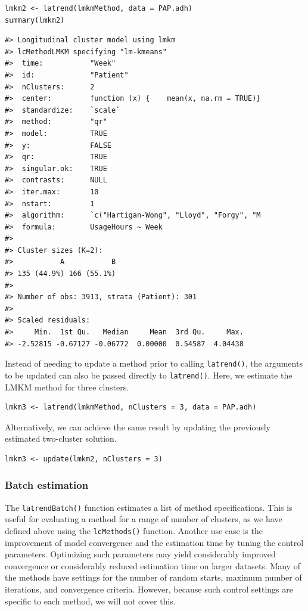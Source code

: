 \begin{verbatim}
lmkm2 <- latrend(lmkmMethod, data = PAP.adh)
summary(lmkm2)
\end{verbatim}

\begin{verbatim}
#> Longitudinal cluster model using lmkm
#> lcMethodLMKM specifying "lm-kmeans"
#>  time:           "Week"
#>  id:             "Patient"
#>  nClusters:      2
#>  center:         function (x) {    mean(x, na.rm = TRUE)}
#>  standardize:    `scale`
#>  method:         "qr"
#>  model:          TRUE
#>  y:              FALSE
#>  qr:             TRUE
#>  singular.ok:    TRUE
#>  contrasts:      NULL
#>  iter.max:       10
#>  nstart:         1
#>  algorithm:      `c("Hartigan-Wong", "Lloyd", "Forgy", "M
#>  formula:        UsageHours ~ Week
#> 
#> Cluster sizes (K=2):
#>           A           B 
#> 135 (44.9%) 166 (55.1%) 
#> 
#> Number of obs: 3913, strata (Patient): 301
#> 
#> Scaled residuals:
#>     Min.  1st Qu.   Median     Mean  3rd Qu.     Max. 
#> -2.52815 -0.67127 -0.06772  0.00000  0.54587  4.04438
\end{verbatim}

Instead of needing to update a method prior to calling \texttt{latrend()}, the arguments to be updated can also be passed directly to \texttt{latrend()}. Here, we estimate the LMKM method for three clusters.

\begin{verbatim}
lmkm3 <- latrend(lmkmMethod, nClusters = 3, data = PAP.adh)
\end{verbatim}

Alternatively, we can achieve the same result by updating the previously estimated two-cluster solution.

\begin{verbatim}
lmkm3 <- update(lmkm2, nClusters = 3)
\end{verbatim}

\subsubsection{Batch estimation}\label{batch-estimation}

The \texttt{latrendBatch()} function estimates a list of method specifications. This is useful for evaluating a method for a range of number of clusters, as we have defined above using the \texttt{lcMethods()} function. Another use case is the improvement of model convergence and the estimation time by tuning the control parameters. Optimizing such parameters may yield considerably improved convergence or considerably reduced estimation time on larger datasets. Many of the methods have settings for the number of random starts, maximum number of iterations, and convergence criteria. However, because such control settings are specific to each method, we will not cover this.

